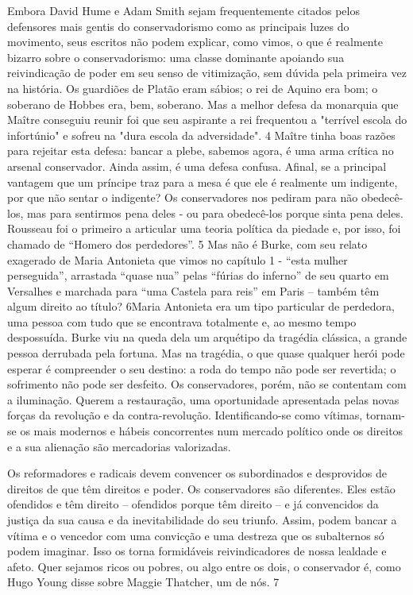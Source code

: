  
\par
 
Embora David Hume e Adam Smith sejam frequentemente citados pelos defensores mais gentis do conservadorismo como as principais luzes do movimento, seus escritos não podem explicar, como vimos, o que é realmente bizarro sobre o conservadorismo: uma classe dominante apoiando sua reivindicação de poder em seu senso de vitimização, sem dúvida pela primeira vez na história. Os guardiões de Platão eram sábios; o rei de Aquino era bom; o soberano de Hobbes era, bem, soberano. Mas a melhor defesa da monarquia que Maître conseguiu reunir foi que seu aspirante a rei frequentou a "terrível escola do infortúnio" e sofreu na "dura escola da adversidade".
 {\color{blue} 4}  
Maître tinha boas razões para rejeitar esta defesa: bancar a plebe, sabemos agora, é uma arma crítica no arsenal conservador. Ainda assim, é uma defesa confusa. Afinal, se a principal vantagem que um príncipe traz para a mesa é que ele é realmente um indigente, por que não sentar o indigente? Os conservadores nos pediram para não obedecê-los, mas para sentirmos pena deles - ou para obedecê-los porque sinta pena deles. Rousseau foi o primeiro a articular uma teoria política da piedade e, por isso, foi chamado de “Homero dos perdedores”.
 {\color{blue} 5}  
Mas não é Burke, com seu relato exagerado de Maria Antonieta que vimos no capítulo 1 - “esta mulher perseguida”, arrastada “quase nua” pelas “fúrias do inferno” de seu quarto em Versalhes e marchada para “uma Castela para reis” em Paris – também têm algum direito ao título? 6Maria Antonieta era um tipo particular de perdedora, uma pessoa com tudo que se encontrava totalmente e, ao mesmo tempo despossuída. Burke viu na queda dela um arquétipo da tragédia clássica, a grande pessoa derrubada pela fortuna. Mas na tragédia, o que quase qualquer herói pode esperar é compreender o seu destino: a roda do tempo não pode ser revertida; o sofrimento não pode ser desfeito. Os conservadores, porém, não se contentam com a iluminação. Querem a restauração, uma oportunidade apresentada pelas novas forças da revolução e da contra-revolução. Identificando-se como vítimas, tornam-se os mais modernos e hábeis concorrentes num mercado político onde os direitos e a sua alienação são mercadorias valorizadas.
 
\par
 
Os reformadores e radicais devem convencer os subordinados e desprovidos de direitos de que têm direitos e poder. Os conservadores são diferentes. Eles estão ofendidos e têm direito – ofendidos porque têm direito – e já convencidos da justiça da sua causa e da inevitabilidade do seu triunfo. Assim, podem bancar a vítima e o vencedor com uma convicção e uma destreza que os subalternos só podem imaginar. Isso os torna formidáveis ​​reivindicadores de nossa lealdade e afeto. Quer sejamos ricos ou pobres, ou algo entre os dois, o conservador é, como Hugo Young disse sobre Maggie Thatcher, um de nós.
 {\color{blue} 7}  

